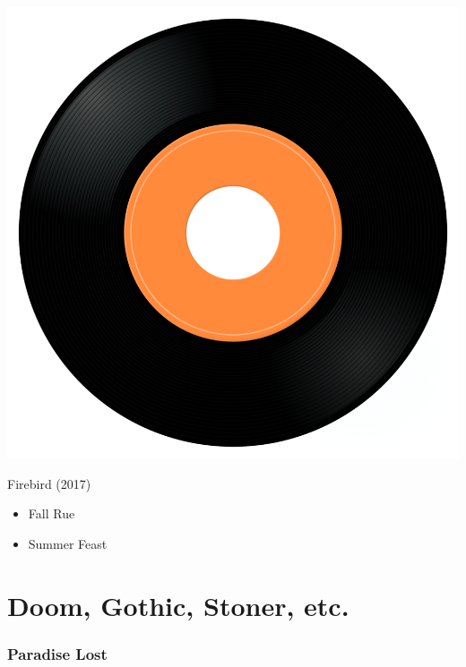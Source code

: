 \begin{minipage}[t]{0.25\textwidth}
\captionsetup{type=figure}
\includegraphics[width=\textwidth]{Images/cover.png}
\caption*{Firebird (2017)}
\end{minipage}
\begin{minipage}[t]{0.25\textwidth}\vspace{0pt}
\begin{itemize}[nosep,leftmargin=1em,labelwidth=*,align=left]
	\setlength{\itemsep}{0pt}
	\item Fall Rue
	\item Summer Feast
\end{itemize}
\end{minipage}


\section{Doom, Gothic, Stoner, etc.}

\subsubsection{Paradise Lost}

